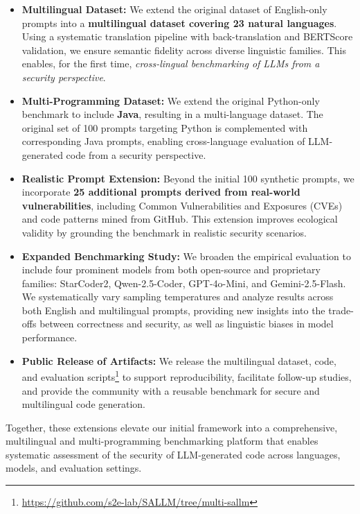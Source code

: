 \documentclass[pdflatex,sn-mathphys-ay]{sn-jnl}
\begin{document}
\begin{itemize}
    \item \textbf{Multilingual Dataset:} We extend the original dataset of English-only prompts into a \textbf{multilingual dataset covering 23 natural languages}. Using a systematic translation pipeline with back-translation and BERTScore validation, we ensure semantic fidelity across diverse linguistic families. This enables, for the first time, \textit{cross-lingual benchmarking of LLMs from a security perspective}.

    \item \textbf{Multi-Programming Dataset:} We extend the original Python-only benchmark to include \textbf{Java}, resulting in a multi-language dataset. The original set of 100 prompts targeting Python is complemented with corresponding Java prompts, enabling cross-language evaluation of LLM-generated code from a security perspective.

    \item \textbf{Realistic Prompt Extension:} Beyond the initial 100 synthetic prompts, we incorporate \textbf{25 additional prompts derived from real-world vulnerabilities}, including Common Vulnerabilities and Exposures (CVEs) and code patterns mined from GitHub. This extension improves ecological validity by grounding the benchmark in realistic security scenarios.

    \item \textbf{Expanded Benchmarking Study:} We broaden the empirical evaluation to include four prominent models from both open-source and proprietary families: StarCoder2, Qwen-2.5-Coder, GPT-4o-Mini, and Gemini-2.5-Flash. We systematically vary sampling temperatures and analyze results across both English and multilingual prompts, providing new insights into the trade-offs between correctness and security, as well as linguistic biases in model performance.
    
    \item \textbf{Public Release of Artifacts:} We release the multilingual dataset, code, and evaluation scripts\footnote{\url{https://github.com/s2e-lab/SALLM/tree/multi-sallm}} to support reproducibility, facilitate follow-up studies, and provide the community with a reusable benchmark for secure and multilingual code generation.
\end{itemize}

Together, these extensions elevate our initial framework into a comprehensive, multilingual and multi-programming benchmarking platform that enables systematic assessment of the security of LLM-generated code across languages, models, and evaluation settings.
\end{document}
